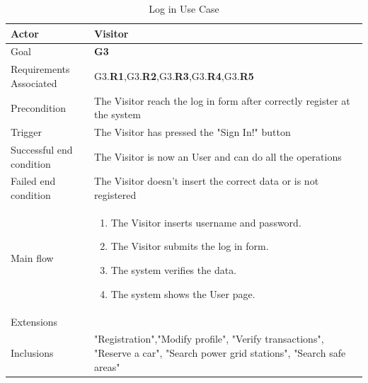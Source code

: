 \newline
\begin{table}[htb]
\begin{center}
\renewcommand{\arraystretch}{1.5}
\begin{tabular}{|l|p{}|}
\hline
Actor & Visitor \\ \hline
Goal & \textbf{G3} \\ \hline
Requirements Associated & G3.\textbf{R1},G3.\textbf{R2},G3.\textbf{R3},G3.\textbf{R4},G3.\textbf{R5} \\ \hline
Precondition & The Visitor reach the log in form after correctly register at the system \\ \hline
Trigger & The Visitor has pressed the "Sign In!" button \\ \hline
Successful end condition & The Visitor is now an User and can do all the operations \\ \hline
Failed end condition & The Visitor doesn't insert the correct data or is not registered \\ \hline
Main flow & \begin{minipage}[t]{0.6\textwidth}
\begin{enumerate}
\addtolength{\itemindent}{0.5cm}
\item The Visitor inserts username and password.
\item The Visitor submits the log in form.
\item The system verifies the data.
\item The system shows the User page.
\vspace{1,5mm}
\end{enumerate}
\end{minipage} \\ \hline
Extensions & \\ \hline
Inclusions & "Registration","Modify profile", "Verify transactions", "Reserve a car", "Search power grid stations", "Search safe areas"  \\ \hline
\end{tabular}
\caption{Log in Use Case}
\end{center}
\end{table}
\clearpage

